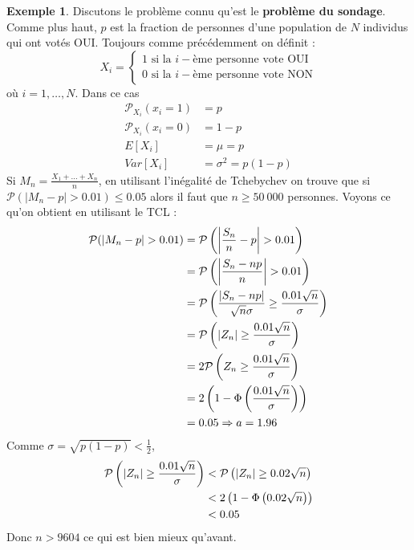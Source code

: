\documentclass[a4paper,12pt]{report}
\theoremstyle{definition}
\renewcommand{\(}{\left(}
\renewcommand{\)}{\right)}
\renewcommand{\b}{\textbf}
\renewcommand{\P}{\mathcal{P}}
\renewcommand{\t}{\text}
\newtheorem{exmp}[thm]{Exemple}
\begin{document}
        \begin{exmp}
            Discutons le problème connu qu'est le \b{problème du sondage}. Comme plus haut, $p$ est la fraction de personnes d'une population de $N$ individus qui ont votés OUI. Toujours comme précédemment on définit :
            $$X_i = \begin{cases}
            1 \t{ si la }i-\t{ème personne vote OUI}\\
            0 \t{ si la }i-\t{ème personne vote NON}
            \end{cases}$$
            où $i=1,\dots,N$. Dans ce cas
            \begin{align*}
                \P_{X_i}(x_i=1) &= p \\
                \P_{X_i}(x_i=0) &= 1-p \\
                E[X_i] &= \mu = p \\
                Var[X_i] &= \sigma^2 = p(1-p)
            \end{align*}
            Si $M_n = \frac{X_1+\dots+X_n}{n}$, en utilisant l'inégalité de Tchebychev on trouve que  si $\P(|M_n-p|>0.01)\leq 0.05$ alors il faut que $n\geq50~000$ personnes. Voyons ce qu'on obtient en utilisant le TCL :
            \begin{align*}
                \P(|M_n-p|>0.01) &= \P\left( \abs{\frac{S_n}{n}-p} >0.01 \right) \\
                &= \P\left( \abs{\frac{S_n-np}{n}} > 0.01\right) \\
                &= \P\left( \frac{\abs{S_n-np}}{\sqrt{n}\sigma} \geq \frac{0.01\sqrt{n}}{\sigma} \right) \\
                &= \P\left( \abs{Z_n} \geq \frac{0.01\sqrt{n}}{\sigma}\right) \\
                &= 2 \P\left( Z_n \geq \frac{0.01\sqrt{n}}{\sigma}\right) \\
                &= 2\left(1-\Phi\left( \frac{0.01\sqrt{n}}{\sigma} \right) \right) \\
                &= 0.05 \Rightarrow a = 1.96
            \end{align*}
            Comme $\sigma = \sqrt{p(1-p)} <\frac{1}{2}$,
            \begin{align*}
                \P\left( \abs{Z_n} \geq \frac{0.01\sqrt{n}}{\sigma}\right) &< \P\left( \abs{Z_n} \geq 0.02\sqrt{n}\right) \\
                &< 2\left(1-\Phi\left( 0.02\sqrt{n} \right) \right) \\
                &< 0.05
            \end{align*}
            Donc $n> 9604$ ce qui est bien mieux qu'avant.
        \end{exmp}
    
\end{document}
